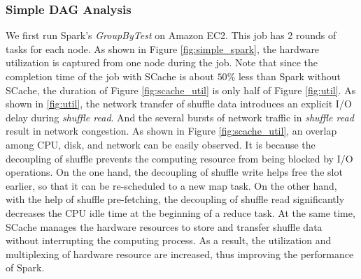 \subsubsection{Simple DAG Analysis}\label{simpledag}
We first run Spark's \textit{GroupByTest} on Amazon EC2.
This job has 2 rounds of tasks for each node.
As shown in Figure \ref{fig:simple_spark}, the hardware utilization is captured from one node during the job. 
Note that since the completion time of the job with SCache is about $50\%$ less than Spark without SCache, the duration of Figure \ref{fig:scache_util} is only half of Figure \ref{fig:util}.
As shown in \ref{fig:util}, the network transfer of shuffle data introduces an explicit I/O delay during \textit{shuffle read}.
And the several bursts of network traffic in \textit{shuffle read} result in network congestion.
As shown in Figure \ref{fig:scache_util}, an overlap among CPU, disk, and network can be easily observed. 
It is because the decoupling of shuffle prevents the computing resource from being blocked by I/O operations. 
On the one hand, the decoupling of shuffle write helps free the slot earlier, so that it can be re-scheduled to a new map task.
On the other hand, with the help of shuffle pre-fetching, the decoupling of shuffle read significantly decreases the CPU idle time at the beginning of a reduce task.
At the same time, SCache manages the hardware resources to store and transfer shuffle data without interrupting the computing process.
As a result, the utilization and multiplexing of hardware resource are increased, thus improving the performance of Spark. 

